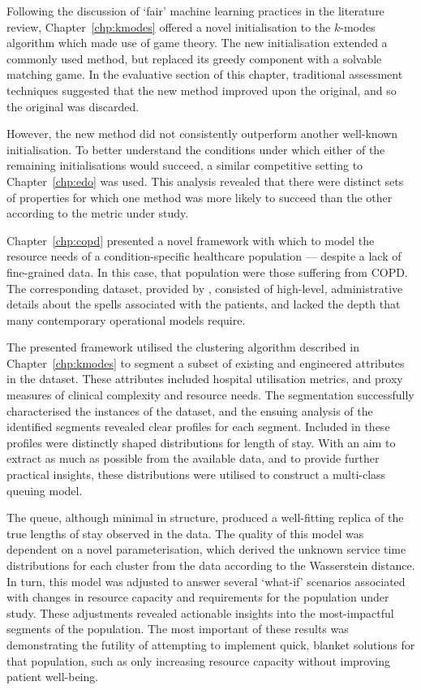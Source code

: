 Following the discussion of `fair' machine learning practices in the literature
review, Chapter~\ref{chp:kmodes} offered a novel initialisation to the
\(k\)-modes algorithm which made use of game theory. The new initialisation
extended a commonly used method, but replaced its greedy component with a
solvable matching game. In the evaluative section of this chapter, traditional
assessment techniques suggested that the new method improved upon the original,
and so the original was discarded.

However, the new method did not consistently outperform another well-known
initialisation. To better understand the conditions under which either of the
remaining initialisations would succeed, a similar competitive setting to
Chapter~\ref{chp:edo} was used. This analysis revealed that there were distinct
sets of properties for which one method was more likely to succeed than the
other according to the metric under study.

Chapter~\ref{chp:copd} presented a novel framework with which to model the
resource needs of a condition-specific healthcare population --- despite a lack
of fine-grained data. In this case, that population were those suffering from
COPD. The corresponding dataset, provided by \ctmuhb, consisted of high-level,
administrative details about the spells associated with the patients, and lacked
the depth that many contemporary operational models require.

The presented framework utilised the clustering algorithm described in
Chapter~\ref{chp:kmodes} to segment a subset of existing and engineered
attributes in the dataset. These attributes included hospital utilisation
metrics, and proxy measures of clinical complexity and resource needs. The
segmentation successfully characterised the instances of the dataset, and the
ensuing analysis of the identified segments revealed clear profiles for each
segment. Included in these profiles were distinctly shaped distributions for
length of stay. With an aim to extract as much as possible from the available
data, and to provide further practical insights, these distributions were
utilised to construct a multi-class queuing model.

The queue, although minimal in structure, produced a well-fitting replica of the
true lengths of stay observed in the data. The quality of this model was
dependent on a novel parameterisation, which derived the unknown service time
distributions for each cluster from the data according to the Wasserstein
distance. In turn, this model was adjusted to answer several `what-if' scenarios
associated with changes in resource capacity and requirements for the population
under study. These adjustments revealed actionable insights into the
most-impactful segments of the population. The most important of these results
was demonstrating the futility of attempting to implement quick, blanket
solutions for that population, such as only increasing resource capacity without
improving patient well-being.


